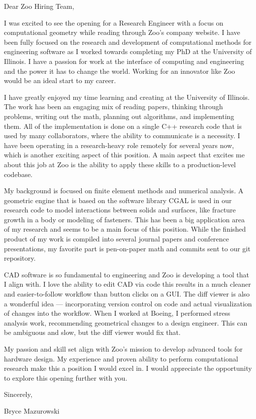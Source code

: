\documentclass{resume}
\begin{document}
\vspace{0.5in}
Dear Zoo Hiring Team,

I was excited to see the opening for a Research Engineer
with a focus on computational geometry while reading through
Zoo's company website.
%
I have been fully focused on the research and development of
computational methods for engineering software as I worked towards
completing my PhD at the University of Illinois.
%
I have a passion for work at the interface
of computing and engineering and the power it has to change the world.
%
Working for an innovator like Zoo would be an ideal start to my career.
%

I have greatly enjoyed my time learning and creating at the University
of Illinois.
%
The work has been an engaging mix of reading papers, thinking through
problems, writing out the math, planning out algorithms, and
implementing them.
%
All of the implementation is done on a single C++ research code that
is used by many collaborators, where the ability to communicate
is a necessity. 
%
I have been operating in a research-heavy role remotely for
several years now, which is another exciting aspect of this position.
%
A main aspect that excites me about this job at Zoo is the ability to
apply these skills to a production-level codebase.
%

My background is focused on finite element methods and numerical analysis.
%
A geometric engine that is based on the software library CGAL is used
in our research code to model interactions between solids and
surfaces, like fracture growth in a body or modeling of fasteners.
%
This has been a big application area of my research and seems to be a
main focus of this position.
%
While the finished product of my work is compiled into several journal
papers and conference presentations, my favorite part is pen-on-paper math
and commits sent to our git repository.
%

CAD software is so fundamental to engineering and
Zoo is developing a tool that I align with.
%
I love the ability to edit CAD via code this results in
a much cleaner and easier-to-follow workflow than button clicks on a GUI.
%
The diff viewer is also a wonderful idea --- incorporating version control
on code and actual visualization of changes into the workflow.
%
When I worked at Boeing, I performed stress analysis work,
recommending geometrical changes to a design engineer.
%
This can be ambiguous and slow, but the diff viewer would fix that.
%

My passion and skill set align with Zoo's mission to develop
advanced tools for hardware design.
%
My experience and proven ability to perform computational research
make this a position I would excel in.
%
I would appreciate the opportunity to explore this opening further with you.
%


Sincerely,

Bryce Mazurowski
\end{document}
